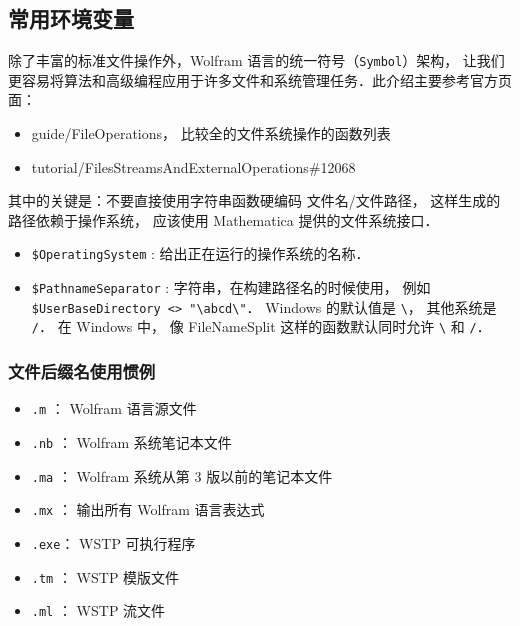 
\begin{issues}
\issueDraft
\issueTODO
\end{issues}

\subsection{常用环境变量}

除了丰富的标准文件操作外，Wolfram 语言的统一符号（\verb`Symbol`）架构，
让我们更容易将算法和高级编程应用于许多文件和系统管理任务．此介绍主要参考官方页面：

\begin{itemize}
\item guide/FileOperations， 比较全的文件系统操作的函数列表
\item tutorial/FilesStreamsAndExternalOperations\#12068
\end{itemize}

其中的关键是：不要直接使用字符串函数硬编码 文件名/文件路径， 
这样生成的路径依赖于操作系统， 应该使用 Mathematica 提供的文件系统接口．

\begin{itemize}
\item \verb`$OperatingSystem` : 给出正在运行的操作系统的名称．
\item \verb`$PathnameSeparator` : 字符串，在构建路径名的时候使用， 例如 \verb|$UserBaseDirectory <> "\abcd\"|． 
Windows 的默认值是 \verb|\|， 其他系统是 \verb|/|．
在 Windows 中， 像 FileNameSplit 这样的函数默认同时允许 \verb|\| 和 \verb|/|．
\end{itemize}

\subsubsection{文件后缀名使用惯例}

\begin{itemize}
\item \verb`.m`  ： Wolfram 语言源文件
\item \verb`.nb` ： Wolfram 系统笔记本文件
\item \verb`.ma` ： Wolfram 系统从第 $3$ 版以前的笔记本文件
\item \verb`.mx` ： 输出所有 Wolfram 语言表达式
\item \verb`.exe`： WSTP 可执行程序
\item \verb`.tm` ： WSTP 模版文件
\item \verb`.ml` ： WSTP 流文件
\end{itemize}

